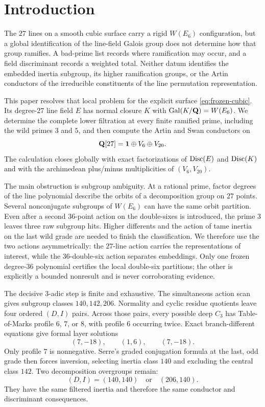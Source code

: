 \section{Introduction}
\label{sec:introduction}

The $27$ lines on a smooth cubic surface carry a rigid $W(E_6)$
configuration, but a global identification of the line-field Galois group
does not determine how that group ramifies.  A bad-prime list records where
ramification may occur, and a field discriminant records a weighted total.
Neither datum identifies the embedded inertia subgroup, its higher
ramification groups, or the Artin conductors of the irreducible constituents
of the line permutation representation.

This paper resolves that local problem for the explicit surface
\cref{eq:frozen-cubic}.  Its degree-$27$ line field $E$ has normal closure
$K$ with $\operatorname{Gal}(K/\mathbf{Q})=W(E_6)$.  We determine the complete lower filtration at
every finite ramified prime, including the wild primes $3$ and $5$, and then
compute the Artin and Swan conductors on
\[
 \mathbf{Q}[27]=\mathbf{1}\oplus V_6\oplus V_{20}.
\]
The calculation closes globally with exact factorizations of $\operatorname{Disc}(E)$ and
$\operatorname{Disc}(K)$ and with the archimedean plus/minus multiplicities of
$(V_6,V_{20})$.

The main obstruction is subgroup ambiguity.  At a rational prime, factor
degrees of the line polynomial describe the orbits of a decomposition group
on $27$ points.  Several nonconjugate subgroups of $W(E_6)$ can have the same
orbit partition.  Even after a second $36$-point action on the double-sixes
is introduced, the prime $3$ leaves three raw subgroup hits.  Higher
differents and the action of tame inertia on the last wild grade are needed
to finish the classification.  We therefore use the two actions
asymmetrically: the $27$-line action carries the representations of interest,
while the $36$-double-six action separates embeddings.  Only one frozen
degree-$36$ polynomial certifies the local double-six partitions; the other
is explicitly a bounded nonresult and is never corroborating evidence.

The decisive $3$-adic step is finite and exhaustive.  The simultaneous action
scan gives subgroup classes $140,142,206$.  Normality and cyclic residue
quotients leave four ordered $(D,I)$ pairs.  Across those pairs, every
possible deep $C_3$ has Table-of-Marks profile $6$, $7$, or $8$, with profile
$6$ occurring twice.  Exact branch-different equations give formal layer
solutions
\[
 (7,-18),\qquad(1,6),\qquad(7,-18).
\]
Only profile $7$ is nonnegative.  Serre's graded conjugation formula at the
last, odd grade then forces inversion, selecting inertia class $140$ and
excluding the central class $142$.  Two decomposition overgroups remain:
\[
 (D,I)=(140,140)\quad\text{or}\quad(206,140).
\]
They have the same filtered inertia and therefore the same conductor and
discriminant consequences.

